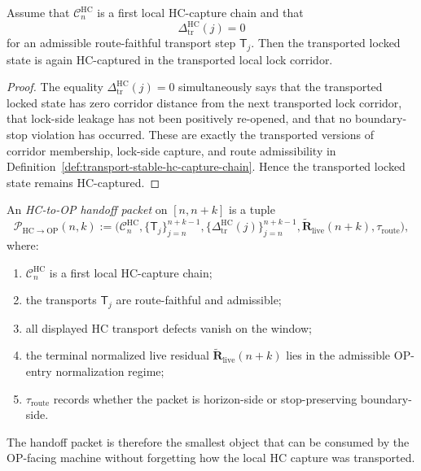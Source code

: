 \begin{lemma}
\label{lem:zero-hc-transport-defect-preserves-capture}
Assume that $\mathcal C_n^{\mathrm{HC}}$ is a first local HC-capture chain and that
\[
 \Delta_{\mathrm{tr}}^{\mathrm{HC}}(j)=0
\]
for an admissible route-faithful transport step $\mathsf T_j$. Then the transported locked state is again HC-captured in the transported local lock corridor.
\end{lemma}

\begin{proof}
The equality $\Delta_{\mathrm{tr}}^{\mathrm{HC}}(j)=0$ simultaneously says that the transported locked state has zero corridor distance from the next transported lock corridor, that lock-side leakage has not been positively re-opened, and that no boundary-stop violation has occurred. These are exactly the transported versions of corridor membership, lock-side capture, and route admissibility in Definition~\ref{def:transport-stable-hc-capture-chain}. Hence the transported locked state remains HC-captured.
\end{proof}

\begin{definition}
\label{def:hc-to-op-handoff-packet}
An \emph{HC-to-OP handoff packet} on $[n,n+k]$ is a tuple
\[
 \mathcal P_{\mathrm{HC}\to\mathrm{OP}}(n,k)
 :=
 \bigl(
 \mathcal C_n^{\mathrm{HC}},
 \{\mathsf T_j\}_{j=n}^{n+k-1},
 \{\Delta_{\mathrm{tr}}^{\mathrm{HC}}(j)\}_{j=n}^{n+k-1},
 \widetilde{\mathbf R}_{\mathrm{live}}(n+k),
 \tau_{\mathrm{route}}
 \bigr),
\]
where:
\begin{enumerate}[leftmargin=2em,label=(\alph*)]
 \item $\mathcal C_n^{\mathrm{HC}}$ is a first local HC-capture chain;
 \item the transports $\mathsf T_j$ are route-faithful and admissible;
 \item all displayed HC transport defects vanish on the window;
 \item the terminal normalized live residual $\widetilde{\mathbf R}_{\mathrm{live}}(n+k)$ lies in the admissible OP-entry normalization regime;
 \item $\tau_{\mathrm{route}}$ records whether the packet is horizon-side or stop-preserving boundary-side.
\end{enumerate}
The handoff packet is therefore the smallest object that can be consumed by the OP-facing machine without forgetting how the local HC capture was transported.
\end{definition}

